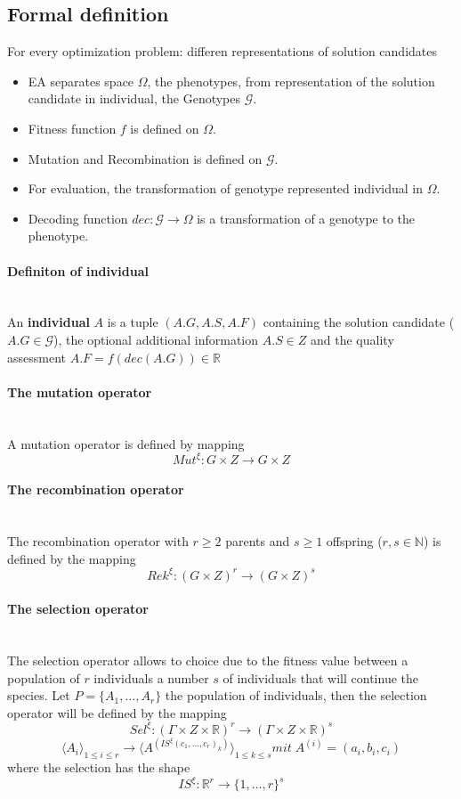 \documentclass{article}
\begin{document}
\subsection{Formal definition}
For every optimization problem: differen representations of solution candidates
\begin{itemize}
    \item EA separates space $\Omega$, the phenotypes, from representation of the solution
          candidate in individual, the Genotypes $\mathcal{G}$.
    \item Fitness function $f$ is defined on $\Omega$.
    \item Mutation and Recombination is defined on $\mathcal{G}$.
    \item For evaluation, the transformation of genotype represented individual in $\Omega$.
    \item Decoding function $dec:\mathcal{G}\rightarrow\Omega$ is a transformation of
          a genotype to the phenotype.
\end{itemize}

\paragraph{Definiton of individual}\mbox{}\\
An \textbf{individual} $A$ is a tuple $(A.G, A.S,A.F)$ containing
the solution candidate ($A.G\in\mathcal{G}$), the optional additional information $A.S\in Z$
and the quality assessment $A.F=f(dec(A.G))\in\mathbb{R}$

\paragraph{The mutation operator}\mbox{}\\
A mutation operator is defined by mapping
$$Mut^\xi:G\times Z\rightarrow G\times Z$$

\paragraph{The recombination operator}\mbox{}\\
The recombination operator with $r\geq 2$ parents
and $s\geq 1$ offspring ($r,s\in\mathbb{N}$) is defined by the mapping
$$Rek^\xi:(G\times Z)^r\rightarrow(G\times Z)^s$$

\paragraph{The selection operator}\mbox{}\\
The selection operator allows to choice due to the fitness value between a population of $r$
individuals a number $s$ of individuals that will continue the species. Let
$P=\{A_1,\dots,A_r\}$ the population of individuals, then the selection operator will
be defined by the mapping
$$Sel^\xi:(\Gamma\times Z\times\mathbb{R})^r\rightarrow(\Gamma\times Z\times\mathbb{R})^s$$
$$\langle A_i\rangle_{1\leq i\leq r}\rightarrow\langle A^{(IS^\xi (c_1,\dots,c_r)_k)}\rangle_{1\leq k\leq s}mit\;A^{(i)}=(a_i,b_i,c_i)$$
where the selection has the shape
$$IS^\xi:\mathbb{R}^r\rightarrow \{1,\dots,r\}^s$$
\end{document}
